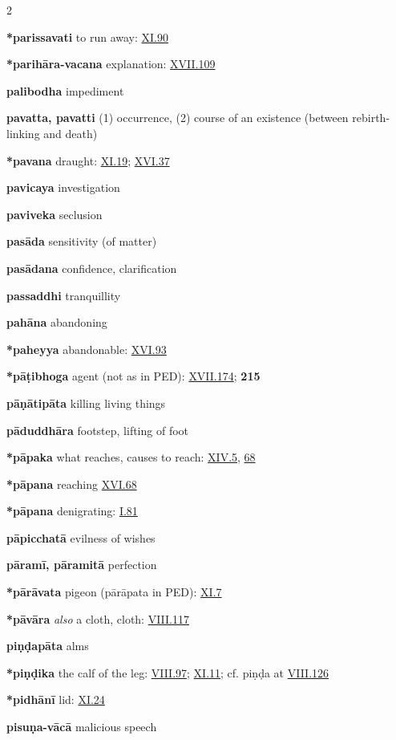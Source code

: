 \begin{multicols}{2}
\begin{vismHanging}
\par\textbf{*parissavati} to run away: \hyperlink{XI.90}{XI.90}{}
\par\textbf{*parihāra-vacana} explanation: \hyperlink{XVII.109}{XVII.109}{} 
\par\textbf{palibodha} impediment 
\par\textbf{pavatta, pavatti} (1) occurrence, (2) course of an existence (between rebirth-linking and death) 
\par\textbf{*pavana} draught: \hyperlink{XI.19}{XI.19}{}; \hyperlink{XVI.37}{XVI.37}{}
\par\textbf{pavicaya} investigation
\par\textbf{paviveka} seclusion
\par\textbf{pasāda} sensitivity (of matter) 
\par\textbf{pasādana} confidence, clarification 
\par\textbf{passaddhi} tranquillity
\par\textbf{pahāna} abandoning
\par\textbf{*paheyya} abandonable: \hyperlink{XVI.93}{XVI.93}{}
\par\textbf{*pāṭibhoga} agent (not as in PED): \hyperlink{XVII.174}{XVII.174}{}; \textbf{\cite{Peṭ} 215} 
\par\textbf{pāṇātipāta} killing living things
\par\textbf{pāduddhāra} footstep, lifting of foot
\par\textbf{*pāpaka} what reaches, causes to reach: \hyperlink{XIV.5}{XIV.5}{}, \hyperlink{XIV.68}{68}{} 
\par\textbf{*pāpana} reaching \hyperlink{XVI.68}{XVI.68}{}
\par\textbf{*pāpana} denigrating: \hyperlink{I.81}{I.81}{}
\par\textbf{pāpicchatā} evilness of wishes
\par\textbf{pāramī, pāramitā} perfection
\par\textbf{*pārāvata} pigeon (pārāpata in PED): \hyperlink{XI.7}{XI.7}{}
\par\textbf{*pāvāra} \emph{also }a cloth, cloth: \hyperlink{VIII.117}{VIII.117}{}
\par\textbf{piṇḍapāta} alms
\par\textbf{*piṇḍika} the calf of the leg: \hyperlink{VIII.97}{VIII.97}{}; \hyperlink{XI.11}{XI.11}{}; cf. piṇḍa at \hyperlink{VIII.126}{VIII.126}{} 
\par\textbf{*pidhānī} lid: \hyperlink{XI.24}{XI.24}{}
\par\textbf{pisuṇa-vācā} malicious speech

\end{vismHanging}
\end{multicols}
